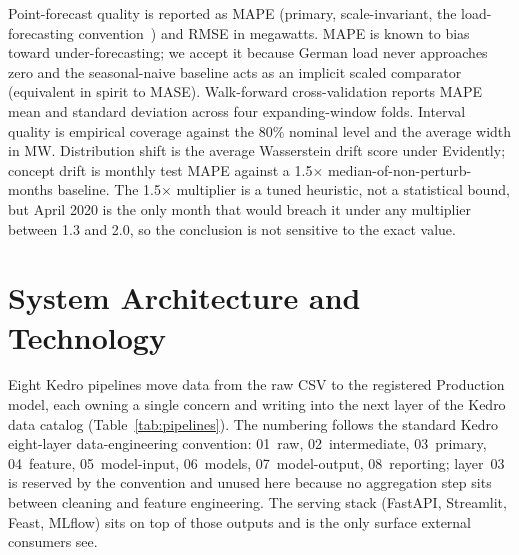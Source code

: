 \documentclass[11pt,a4paper]{article}
\begin{document}
Point-forecast quality is reported as MAPE (primary, scale-invariant, the load-forecasting convention~\cite{hong2016probabilistic}) and RMSE in megawatts. MAPE is known to bias toward under-forecasting; we accept it because German load never approaches zero and the seasonal-naive baseline acts as an implicit scaled comparator (equivalent in spirit to MASE). Walk-forward cross-validation reports MAPE mean and standard deviation across four expanding-window folds. Interval quality is empirical coverage against the 80\% nominal level and the average width in MW. Distribution shift is the average Wasserstein drift score under Evidently; concept drift is monthly test MAPE against a 1.5$\times$ median-of-non-perturb-months baseline. The 1.5$\times$ multiplier is a tuned heuristic, not a statistical bound, but April 2020 is the only month that would breach it under any multiplier between 1.3 and 2.0, so the conclusion is not sensitive to the exact value.

\section{System Architecture and Technology}

Eight Kedro pipelines move data from the raw CSV to the registered Production model, each owning a single concern and writing into the next layer of the Kedro data catalog (Table~\ref{tab:pipelines}). The numbering follows the standard Kedro eight-layer data-engineering convention: 01~raw, 02~intermediate, 03~primary, 04~feature, 05~model-input, 06~models, 07~model-output, 08~reporting; layer~03 is reserved by the convention and unused here because no aggregation step sits between cleaning and feature engineering. The serving stack (FastAPI, Streamlit, Feast, MLflow) sits on top of those outputs and is the only surface external consumers see.
\end{document}
